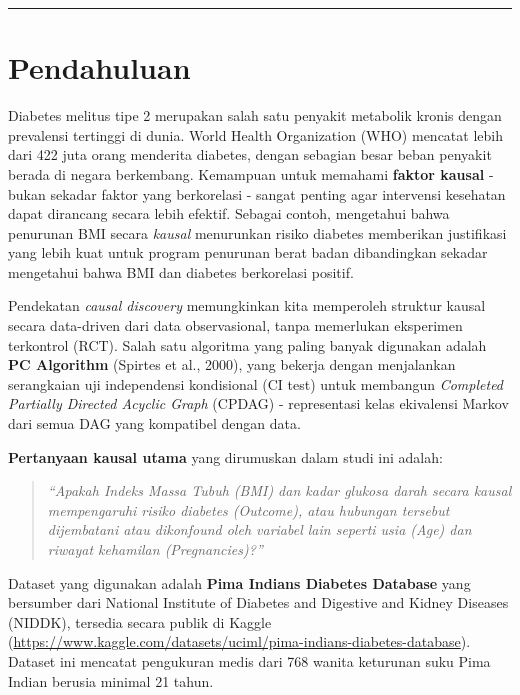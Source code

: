 \documentclass[
  11pt,
]{article}
\begin{document}
\begin{center}\rule{0.5\linewidth}{0.5pt}\end{center}

\section{Pendahuluan}\label{pendahuluan}

Diabetes melitus tipe 2 merupakan salah satu penyakit metabolik kronis
dengan prevalensi tertinggi di dunia. World Health Organization (WHO)
mencatat lebih dari 422 juta orang menderita diabetes, dengan sebagian
besar beban penyakit berada di negara berkembang. Kemampuan untuk
memahami \textbf{faktor kausal} - bukan sekadar faktor yang berkorelasi
- sangat penting agar intervensi kesehatan dapat dirancang secara lebih
efektif. Sebagai contoh, mengetahui bahwa penurunan BMI secara
\emph{kausal} menurunkan risiko diabetes memberikan justifikasi yang
lebih kuat untuk program penurunan berat badan dibandingkan sekadar
mengetahui bahwa BMI dan diabetes berkorelasi positif.

Pendekatan \emph{causal discovery} memungkinkan kita memperoleh struktur
kausal secara data-driven dari data observasional, tanpa memerlukan
eksperimen terkontrol (RCT). Salah satu algoritma yang paling banyak
digunakan adalah \textbf{PC Algorithm} (Spirtes et al., 2000), yang
bekerja dengan menjalankan serangkaian uji independensi kondisional (CI
test) untuk membangun \emph{Completed Partially Directed Acyclic Graph}
(CPDAG) - representasi kelas ekivalensi Markov dari semua DAG yang
kompatibel dengan data.

\textbf{Pertanyaan kausal utama} yang dirumuskan dalam studi ini adalah:

\begin{quote}
\emph{``Apakah Indeks Massa Tubuh (BMI) dan kadar glukosa darah secara
kausal mempengaruhi risiko diabetes (Outcome), atau hubungan tersebut
dijembatani atau dikonfound oleh variabel lain seperti usia (Age) dan
riwayat kehamilan (Pregnancies)?''}
\end{quote}

Dataset yang digunakan adalah \textbf{Pima Indians Diabetes Database}
yang bersumber dari National Institute of Diabetes and Digestive and
Kidney Diseases (NIDDK), tersedia secara publik di Kaggle
(\url{https://www.kaggle.com/datasets/uciml/pima-indians-diabetes-database}).
Dataset ini mencatat pengukuran medis dari 768 wanita keturunan suku
Pima Indian berusia minimal 21 tahun.
\end{document}
